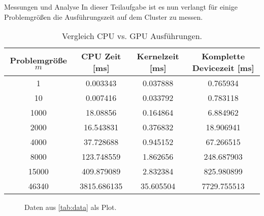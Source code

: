\documentclass[
ngerman,
subtask=ruled %
]{tudaexercise}
\begin{document}
	\begin{task}{Messungen und Analyse} 
		In dieser Teilaufgabe ist es nun verlangt für einige Problemgrößen die Ausführungszeit auf dem Cluster zu messen.
		
		
		\begin{table}[H]
			\centering
			\begin{tabular}{|c|c|c|c|}
				\hline
				\textbf{Problemgröße} $m$ & \textbf{CPU Zeit} [ms] & \textbf{Kernelzeit} [ms] & \textbf{Komplette Devicezeit} [ms]  \\
				\hline
				1 & 0.003343 & 0.037888 & 0.765934 \\
				10 & 0.007416 & 0.033792 & 0.783118 \\
				1000 & 18.08856 & 0.164864 & 6.884962 \\
				2000 & 16.543831 & 0.376832 & 18.906941 \\
				4000 & 37.728688 & 0.945152 & 67.266515 \\
				8000 & 123.748559 & 1.862656 & 248.687903 \\
				15000 & 409.879089 & 2.832384 & 825.980899 \\
				46340 & 3815.686135 & 35.605504 & 7729.755513 \\
				\hline
			\end{tabular}
			
	
			\caption{Vergleich CPU vs. GPU Ausführungen.}
			\label{tab:data}
		\end{table}
		\begin{figure}[H]
			\caption{Daten aus \autoref{tab:data} als Plot.}
		\end{figure}
		

\end{task}
\end{document}
